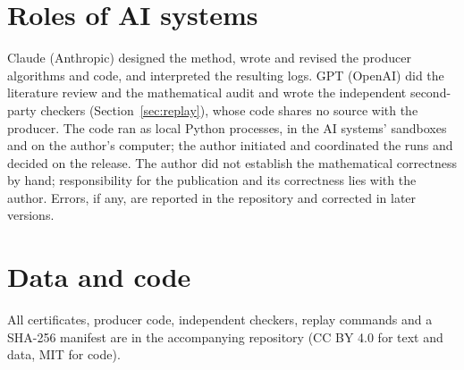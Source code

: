 \documentclass[11pt]{article}
\theoremstyle{remark}
\begin{document}
\section{Roles of AI systems}\label{sec:ai}
Claude (Anthropic) designed the method, wrote and revised the producer algorithms and code, and interpreted the
resulting logs. GPT (OpenAI) did the literature review and the mathematical audit and wrote the independent
second-party checkers (Section~\ref{sec:replay}), whose code shares no source with the producer. The code ran as
local Python processes, in the AI systems' sandboxes and on the author's computer; the author initiated and
coordinated the runs and decided on the release. The author did not establish the mathematical correctness by hand;
responsibility for the publication and its correctness lies with the author. Errors, if any, are reported in the
repository and corrected in later versions.

\section*{Data and code}
All certificates, producer code, independent checkers, replay commands and a SHA-256 manifest are in the accompanying
repository (CC BY 4.0 for text and data, MIT for code).
\end{document}
